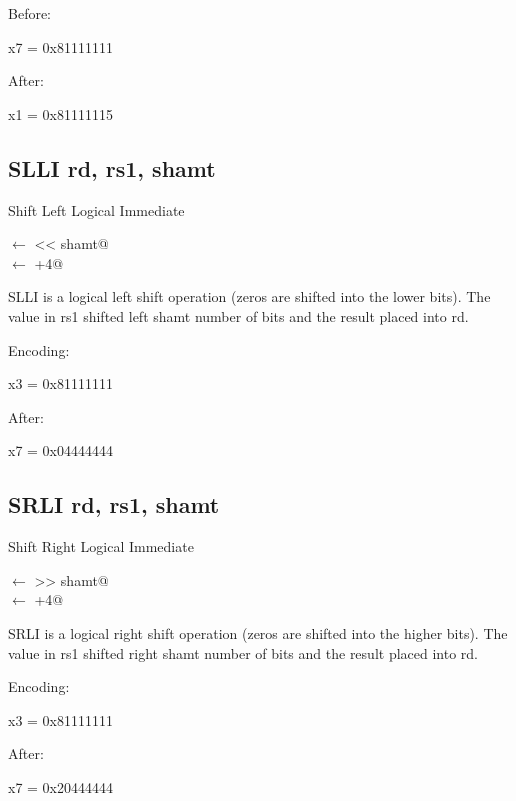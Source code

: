 
Before:

x7 = 0x81111111

After:

x1 = 0x81111115

\subsection{SLLI rd, rs1, shamt}

Shift Left Logical Immediate

\verb@rd@ $\leftarrow$  << shamt@\\
\verb@pc@ $\leftarrow$ \verb@pc+4@


SLLI is a logical left shift operation (zeros are shifted
into the lower bits).  The value in rs1 shifted left shamt
number of bits and the result placed into rd.~\cite[p.~14]{rvismv1v22:2017}

Encoding:


x3 = 0x81111111

After:

x7 = 0x04444444

\subsection{SRLI rd, rs1, shamt}

Shift Right Logical Immediate

\verb@rd@ $\leftarrow$  >> shamt@\\
\verb@pc@ $\leftarrow$ \verb@pc+4@

SRLI is a logical right shift operation (zeros are shifted
into the higher bits).  The value in rs1 shifted right shamt
number of bits and the result placed into rd.~\cite[p.~14]{rvismv1v22:2017}


Encoding:


x3 = 0x81111111

After:

x7 = 0x20444444

